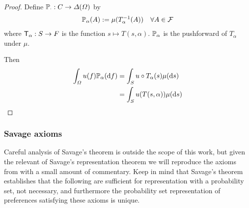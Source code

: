 \begin{proof}
Define $\mathbb{P}_\cdot:C\to \Delta(\Omega)$ by
\begin{align}
    \mathbb{P}_\alpha(A) &:= \mu (T_\alpha^{-1}(A))&\forall A\in \mathcal{F}
\end{align}
where $\mathsf{T}_\alpha:S\to F$ is the function $s\mapsto T(s,\alpha)$. $\mathbb{P}_\alpha$ is the pushforward of $T_\alpha$ under $\mu$.

Then 
\begin{align}
    \int_\Omega u(f)\mathbb{P}_\alpha(\mathrm{d}f) &= \int_S u \circ T_\alpha (s)\mu(\mathrm{d}s)\\
    &= \int_S u(T(s,\alpha))\mu(\mathrm{d}s)
\end{align}
\end{proof}

\subsubsection{Savage axioms}\label{sec:savage_axioms}

Careful analysis of Savage's theorem is outside the scope of this work, but given the relevant of Savage's representation theorem we will reproduce the axioms from \citet{savage_foundations_1954} with a small amount of commentary. Keep in mind that Savage's theorem establishes that the following are sufficient for representation with a probability set, not necessary, and furthermore the probability set representation of preferences satisfying these axioms is unique.

